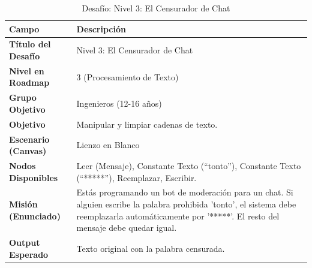 \begin{table}[H]
    \centering
    \caption{Desafío: Nivel 3: El Censurador de Chat}
    \label{tab:desafio-ing-3}
    \begingroup
    \renewcommand{\arraystretch}{\TableRowStretch}
    \begin{tabularx}{\textwidth}{ l X }
        \hline
        \textbf{Campo}              & \textbf{Descripción}                                                                                                                                                                                    \\
        \hline
        \textbf{Título del Desafío} & Nivel 3: El Censurador de Chat                                                                                                                                                                          \\
        \textbf{Nivel en Roadmap}   & 3 (Procesamiento de Texto)                                                                                                                                                                              \\
        \textbf{Grupo Objetivo}     & Ingenieros (12-16 años)                                                                                                                                                                                 \\
        \textbf{Objetivo}           & Manipular y limpiar cadenas de texto.                                                                                                                                                                   \\
        \textbf{Escenario (Canvas)} & Lienzo en Blanco                                                                                                                                                                                        \\
        \textbf{Nodos Disponibles}  & Leer (Mensaje), Constante Texto (“tonto”), Constante Texto (“*****”), Reemplazar, Escribir.                                                                                                             \\
        \textbf{Misión (Enunciado)} & Estás programando un bot de moderación para un chat. Si alguien escribe la palabra prohibida 'tonto', el sistema debe reemplazarla automáticamente por '*****'. El resto del mensaje debe quedar igual. \\
        \textbf{Output Esperado}    & Texto original con la palabra censurada.                                                                                                                                                                \\
        \hline
    \end{tabularx}
    \endgroup
\end{table}

